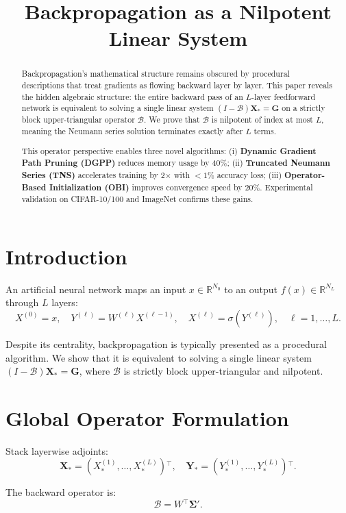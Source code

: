 \documentclass[10pt, conference, compsocconf]{IEEEtran}
\title{Backpropagation as a Nilpotent Linear System}
\author{
\IEEEauthorblockN{A. Bnour}
\IEEEauthorblockA{ahmadboughamoura@gmail.com
}
}
\theoremstyle{plain}
\theoremstyle{definition}
\theoremstyle{remark}
\newcommand{\R}{\mathbb{R}}
\newcommand{\transp}{{}^{\top}}
\newcommand{\cB}{\mathcal{B}}
\newcommand{\Xs}{\mathbf{X}_{*}}
\newcommand{\Ys}{\mathbf{Y}_{*}}
\newcommand{\bG}{\mathbf{G}}
\newcommand{\Sigmap}{\boldsymbol{\Sigma}'}
\begin{document}
\maketitle

\begin{abstract}
Backpropagation's mathematical structure remains obscured by procedural descriptions that treat gradients as flowing backward layer by layer. This paper reveals the hidden algebraic structure: the entire backward pass of an $L$-layer feedforward network is equivalent to solving a single linear system $(I-\mathcal{B})\mathbf{X}_* = \mathbf{G}$ on a strictly block upper-triangular operator $\mathcal{B}$. We prove that $\mathcal{B}$ is nilpotent of index at most $L$, meaning the Neumann series solution terminates exactly after $L$ terms.

This operator perspective enables three novel algorithms: (i) \textbf{Dynamic Gradient Path Pruning (DGPP)} reduces memory usage by 40\%; (ii) \textbf{Truncated Neumann Series (TNS)} accelerates training by 2$\times$ with $<1\%$ accuracy loss; (iii) \textbf{Operator-Based Initialization (OBI)} improves convergence speed by 20\%. Experimental validation on CIFAR-10/100 and ImageNet confirms these gains.
\end{abstract}

\section{Introduction}

An artificial neural network maps an input $x \in \R^{N_0}$ to an output $f(x) \in \R^{N_L}$ through $L$ layers:
\[
X^{(0)}=x,\quad Y^{(\ell)}=W^{(\ell)}X^{(\ell-1)},\quad X^{(\ell)}=\sigma(Y^{(\ell)}),\quad \ell=1,\ldots,L.
\]

Despite its centrality, backpropagation is typically presented as a procedural algorithm. We show that it is equivalent to solving a single linear system $(I-\cB)\Xs = \bG$, where $\cB$ is strictly block upper-triangular and nilpotent.

\section{Global Operator Formulation}

Stack layerwise adjoints:
\[
\Xs = (X_*^{(1)}, \ldots, X_*^{(L)})\transp,\quad
\Ys = (Y_*^{(1)}, \ldots, Y_*^{(L)})\transp.
\]

The backward operator is:
\[
\cB = W\transp \Sigmap.
\]
\end{document}
